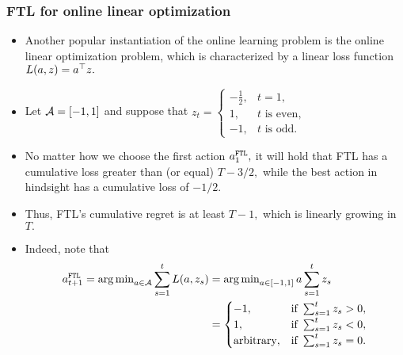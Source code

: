 \documentclass[11pt,compress,t,notes=noshow, xcolor=table]{beamer}
\begin{document}
\begin{vbframe} \frametitle{FTL for online linear optimization}
	\small
	\begin{itemize}
		\item Another popular instantiation of the online learning problem is the online linear optimization problem, which is characterized by a linear loss function $L(a,z)=a^\top z.$ 
		 \item  Let $\mathcal{A}=[-1,1]$ and  suppose that 
		$  z_t = \begin{cases}
			-\frac12, & \mbox{$t=1,$} \\
			1, & \mbox{$t$ is even,}\\
			-1, & \mbox{$t$ is odd.}
		\end{cases} $
		 \item No matter how we choose the first action $a_1^{\texttt{FTL}},$ it will hold that FTL has a cumulative loss greater than (or equal) $T-3/2,$ while the best action in hindsight has a cumulative loss of $-1/2.$ 
%		 
		\item Thus, FTL's cumulative regret is at least $T-1,$ which is linearly growing in $T.$
%		 
		\scriptsize
		\item Indeed, note that 
%		
		\begin{align*}
%			
			a_{t+1}^{\FTL} = \argmin_{a \in \Aspace} \sum_{s=1}^t \l(a,z_s) &= \argmin_{a \in [-1,1]} a \sum_{s=1}^t  z_s \\
			&= \begin{cases}
				-1, & \mbox{if }\sum_{s=1}^t  z_s>0,\\
				1, & \mbox{if }\sum_{s=1}^t  z_s<0,\\
				\mbox{arbitrary}, & \mbox{if }\sum_{s=1}^t  z_s=0.\\
			\end{cases} 
%			
		\end{align*}
		 

\end{itemize}
\end{vbframe}
\end{document}
